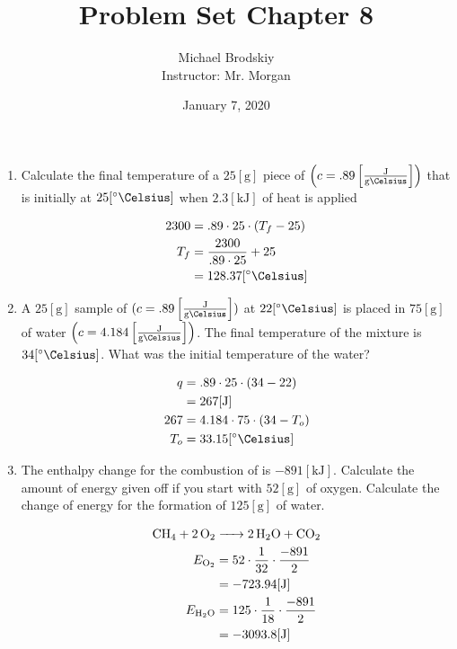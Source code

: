 \documentclass[12pt]{article}
\title{Problem Set Chapter 8}
\date{January 7, 2020}
\author{Michael Brodskiy\\ \small Instructor: Mr. Morgan}
\begin{document}
\maketitle

\begin{enumerate}

  \item Calculate the final temperature of a $25[\si{\gram}]$ piece of  $\left(c=.89\left[ \frac{\si{\joule}}{\si{\gram\Celsius}} \right]\right)$ that is initially at $25[\si{\degree\Celsius}]$ when $2.3[\si{\kilo\joule}]$ of heat is applied

    \begin{equation}
      \begin{split}
        2300&=.89\cdot25\cdot(T_f-25)\\
        T_f&=\frac{2300}{.89\cdot25}+25\\
        &=128.37[\si{\degree\Celsius}]
      \end{split}
      \label{1}
    \end{equation}

  \item A $25[\si{\gram}]$ sample of  $(c=.89\left[ \frac{\si{\joule}}{\si{\gram\Celsius}} \right])$ at $22[\si{\degree\Celsius}]$ is placed in $75[\si{\gram}]$ of water $\left(c=4.184\left[ \frac{\si{\joule}}{\si{\gram\Celsius}} \right]\right)$. The final temperature of the mixture is $34[\si{\degree\Celsius}]$. What was the initial temperature of the water?

    \begin{equation}
      \begin{split}
        q&=.89\cdot25\cdot(34-22)\\
        &=267[\si{\joule}]\\
        267&=4.184\cdot75\cdot(34-T_o)\\
        T_o&=33.15[\si{\degree\Celsius}]
      \end{split}
      \label{2}
    \end{equation}

  \item The enthalpy change for the combustion of  is $-891[\si{\kilo\joule}]$. Calculate the amount of energy given off if you start with $52[\si{\gram}]$ of oxygen. Calculate the change of energy for the formation of $125[\si{\gram}]$ of water.

    \begin{equation}
      \begin{split}
        \ce{CH4 + 2O2 &-> 2H2O + CO2}\\
        E_{\ce{O2}}&=52\cdot\frac{1}{32}\cdot\frac{-891}{2}\\
        &=-723.94[\si{\joule}]\\
        E_{\ce{H2O}}&=125\cdot\frac{1}{18}\cdot\frac{-891}{2}\\
        &=-3093.8[\si{\joule}]
      \end{split}
      \label{3}
    \end{equation}


\end{enumerate}
\end{document}
